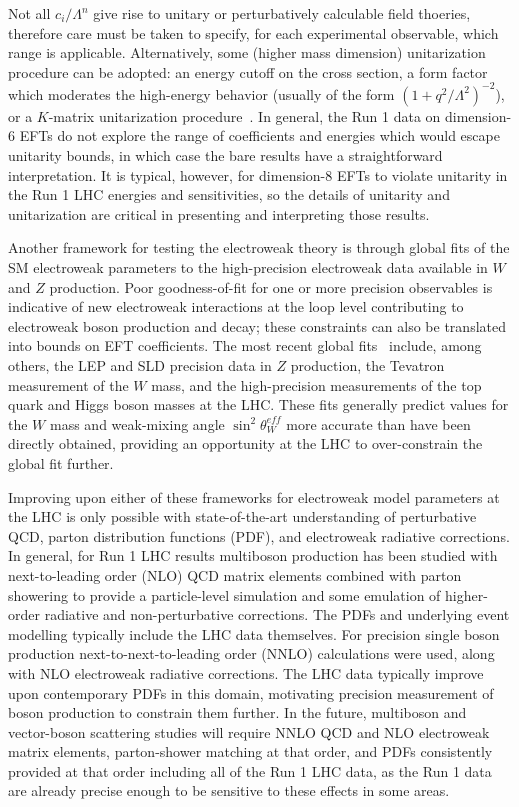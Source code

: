 Not all $c_i/\Lambda^n$ give rise to unitary or perturbatively
calculable field thoeries, therefore care must be taken to specify,
for each experimental observable, which range is applicable.
Alternatively, some (higher mass dimension) unitarization procedure
can be adopted: an energy cutoff on the cross section, a form factor
which moderates the high-energy behavior (usually of the form
$(1+q^2/\Lambda^2)^{-2}$), or a $K$-matrix unitarization
procedure~\cite{Alboteanu:2008my,Chung:1995dx}.  In general, the Run 1
data on dimension-6 EFTs do not explore the range of coefficients and
energies which would escape unitarity bounds, in which case the bare
results have a straightforward interpretation.  It is typical,
however, for dimension-8 EFTs to violate unitarity in the Run 1 LHC
energies and sensitivities, so the details of unitarity and
unitarization are critical in presenting and interpreting those
results.

Another framework for testing the electroweak theory is through global
fits of the SM electroweak parameters to the high-precision
electroweak data available in $W$ and $Z$ production.  Poor
goodness-of-fit for one or more precision observables is indicative of
new electroweak interactions at the loop level contributing to
electroweak boson production and decay; these constraints can also be
translated into bounds on EFT coefficients.  The most recent global
fits~\cite{Baak:2014ora,Ciuchini:2013pca} include, among others, the
LEP and SLD precision data in $Z$ production, the Tevatron measurement
of the $W$ mass, and the high-precision measurements of the top quark
and Higgs boson masses at the LHC.  These fits generally predict
values for the $W$ mass and weak-mixing angle $\sin^2\theta^{eff}_{W}$
more accurate than have been directly obtained, providing an
opportunity at the LHC to over-constrain the global fit further.

Improving upon either of these frameworks for electroweak model
parameters at the LHC is only possible with state-of-the-art
understanding of perturbative QCD, parton distribution functions
(PDF), and electroweak radiative corrections.  In general, for Run 1
LHC results multiboson production has been studied with
next-to-leading order (NLO) QCD matrix elements combined with parton
showering to provide a particle-level simulation and some emulation of
higher-order radiative and non-perturbative corrections. The PDFs and
underlying event modelling typically include the LHC data themselves.
For precision single boson production next-to-next-to-leading order
(NNLO) calculations were used, along with NLO electroweak radiative
corrections.  The LHC data typically improve upon contemporary PDFs in
this domain, motivating precision measurement of boson production to
constrain them further.  In the future, multiboson and vector-boson
scattering studies will require NNLO QCD and NLO electroweak matrix
elements, parton-shower matching at that order, and PDFs consistently
provided at that order including all of the Run 1 LHC data, as the Run
1 data are already precise enough to be sensitive to these effects in
some areas.
